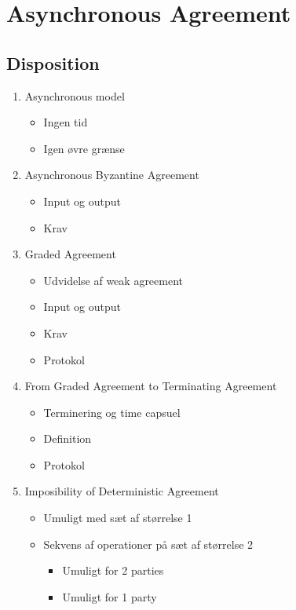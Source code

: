 \documentclass[a4, english]{article}
\begin{document}
\section{Asynchronous Agreement}
\subsection{Disposition}
\begin{enumerate}
	\item Asynchronous model
  \begin{itemize}
  	\item Ingen tid
    \item Igen øvre grænse
  \end{itemize}
  \item Asynchronous Byzantine Agreement
  \begin{itemize}
    \item Input og output
  	\item Krav
  \end{itemize}
  \item Graded Agreement
  \begin{itemize}
  	\item Udvidelse af weak agreement
    \item Input og output
    \item Krav
    \item Protokol
  \end{itemize}
  \item From Graded Agreement to Terminating Agreement
  \begin{itemize}
  	\item Terminering og time capsuel
    \item Definition 
    \item Protokol
  \end{itemize}
  \item Imposibility of Deterministic Agreement
  \begin{itemize}
  	\item Umuligt med sæt af størrelse 1
    \item Sekvens af operationer på sæt af størrelse 2
    \begin{itemize}
    	\item Umuligt for 2 parties 
      \item Umuligt for 1 party
    \end{itemize}
  \end{itemize}
\end{enumerate}
\newpage
\end{document}
